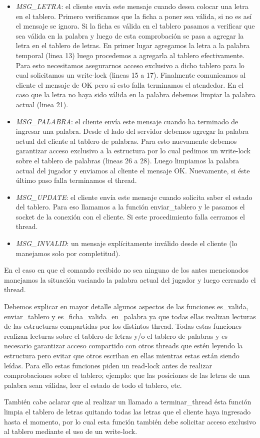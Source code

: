 \documentclass[a4paper,11pt]{article}
\begin{document}
	\begin{itemize}
		\item \emph{MSG\_LETRA}: el cliente envía este mensaje cuando desea colocar una letra en el tablero. Primero verificamos que la ficha a poner sea válida, si no es así el mensaje se ignora. Si la ficha es válida en el tablero pasamos a verificar que sea válida en la palabra y luego de esta comprobación se pasa a agregar la letra en el tablero de letras. En primer lugar agregamos la letra a la palabra temporal (linea 13) luego procedemos a agregarla al tablero efectivamente. Para esto necesitamos asegurarnos acceso exclusivo a dicho tablero para lo cual solicitamos un write-lock (lineas 15 a 17). Finalmente comunicamos al cliente el mensaje de OK pero si esto falla terminamos el atendedor. En el caso que la letra no haya sido válida en la palabra debemos limpiar la palabra actual (linea 21).
		
		\item \emph{MSG\_PALABRA}: el cliente envía este mensaje cuando ha terminado de ingresar una palabra. Desde el lado del servidor debemos agregar la palabra actual del cliente al tablero de palabras. Para esto nuevamente debemos garantizar acceso exclusivo a la estructura por lo cual pedimos un write-lock sobre el tablero de palabras (lineas 26 a 28). Luego limpiamos la palabra actual del jugador y enviamos al cliente el mensaje OK. Nuevamente, si éste último paso falla terminamos el thread.
		
		\item \emph{MSG\_UPDATE}: el cliente envía este mensaje cuando solicita saber el estado del tablero. Para eso llamamos a la función enviar\_tablero y le pasamos el socket de la conexión con el cliente. Si este procedimiento falla cerramos el thread.
		
		\item \emph{MSG\_INVALID}: un mensaje explícitamente inválido desde el cliente (lo manejamos solo por completitud).
	
	\end{itemize}
	
	En el caso en que el comando recibido no sea ninguno de los antes mencionados manejamos la situación vaciando la palabra actual del jugador y luego cerrando el thread.
	
	Debemos explicar en mayor detalle algunos aspectos de las funciones es\_valida, enviar\_tablero y es\_ficha\_valida\_en\_palabra ya que todas ellas realizan lecturas de las estructuras compartidas por los distintos thread.
	Todas estas funciones realizan lecturas sobre el tablero de letras y/o el tablero de palabras y es necesario garantizar acceso compartido con otros threads que estén leyendo la estructura pero evitar que otros escriban en ellas mientras estas están siendo leídas.
	Para ello estas funciones piden un read-lock antes de realizar comprobaciones sobre el tablero; ejemplo: que las posiciones de las letras de una palabra sean válidas, leer el estado de todo el tablero, etc.
	
	También cabe aclarar que al realizar un llamado a terminar\_thread ésta función limpia el tablero de letras quitando todas las letras que el cliente haya ingresado hasta el momento, por lo cual esta función también debe solicitar acceso exclusivo al tablero mediante el uso de un write-lock.
\end{document}
